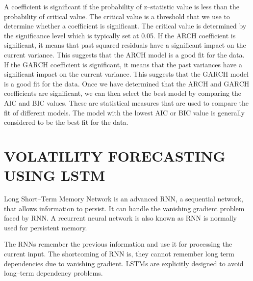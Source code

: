 \documentclass[12pt,a4paper]{report}
\numberwithin{equation}{section}
\begin{document}
A coefficient is significant if the probability of z--statistic value is
less than the probability of critical value. The critical value is a
threshold that we use to determine whether a coefficient is significant.
The critical value is determined by the significance level which is
typically set at 0.05. If the ARCH coefficient is significant, it means
that past squared residuals have a significant impact on the current
variance. This suggests that the ARCH model is a good fit for the data.
If the GARCH coefficient is significant, it means that the past
variances have a significant impact on the current variance. This
suggests that the GARCH model is a good fit for the data. Once we have
determined that the ARCH and GARCH coefficients are significant, we can
then select the best model by comparing the AIC and BIC values. These
are statistical measures that are used to compare the fit of different
models. The model with the lowest AIC or BIC value is generally
considered to be the best fit for the data.

\hypertarget{volatility--forecasting--using--lstm}{%
\section{\texorpdfstring{\textbf{VOLATILITY FORECASTING USING
LSTM}}{VOLATILITY FORECASTING USING LSTM}}\label{volatility--forecasting--using--lstm}}

Long Short--Term Memory Network is an advanced RNN, a sequential network,
that allows information to persist. It can handle the vanishing gradient
problem faced by RNN. A recurrent neural network is also known as RNN is
normally used for persistent memory.

The RNNs remember the previous information and use it for processing the
current input. The shortcoming of RNN is, they cannot remember long term
dependencies due to vanishing gradient. LSTMs are explicitly designed to
avoid long--term dependency problems.
\end{document}
